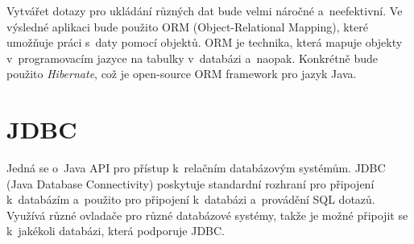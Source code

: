 Vytvářet dotazy pro ukládání různých dat bude velmi náročné a~neefektivní.
Ve výsledné aplikaci bude použito ORM (Object-Relational Mapping), které umožňuje práci s~daty pomocí objektů.
ORM je technika, která mapuje objekty v~programovacím jazyce na tabulky v~databázi a~naopak.
Konkrétně bude použito \textit{Hibernate}, což je open-source ORM framework pro jazyk Java.

\section{JDBC}
Jedná se o~Java API pro přístup k~relačním databázovým systémům.
JDBC (Java Database Connectivity) poskytuje standardní rozhraní pro
připojení k~databázím a~použito pro připojení k~databázi a~provádění SQL dotazů.
Využívá různé ovladače pro různé databázové systémy, takže je možné připojit se k~jakékoli databázi,
která podporuje JDBC.